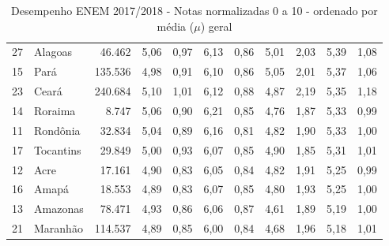 \begin{table}[]
{\begin{tabular}{llrrrrrrrrr}
            \rowcolor[HTML]{DCE6F1}
            27 & Alagoas             & 46.462  & 5,06 & 0,97 & 6,13 & 0,86 & 5,01 & 2,03 & 5,39 & 1,08 \\
            15 & Pará                & 135.536 & 4,98 & 0,91 & 6,10 & 0,86 & 5,05 & 2,01 & 5,37 & 1,06 \\
            \rowcolor[HTML]{DCE6F1}
            23 & Ceará               & 240.684 & 5,10 & 1,01 & 6,12 & 0,88 & 4,87 & 2,19 & 5,35 & 1,18 \\
            14 & Roraima             & 8.747   & 5,06 & 0,90 & 6,21 & 0,85 & 4,76 & 1,87 & 5,33 & 0,99 \\
            \rowcolor[HTML]{DCE6F1}
            11 & Rondônia            & 32.834  & 5,04 & 0,89 & 6,16 & 0,81 & 4,82 & 1,90 & 5,33 & 1,00 \\
            17 & Tocantins           & 29.849  & 5,00 & 0,93 & 6,07 & 0,85 & 4,90 & 1,85 & 5,31 & 1,01 \\
            \rowcolor[HTML]{DCE6F1}
            12 & Acre                & 17.161  & 4,90 & 0,83 & 6,05 & 0,84 & 4,82 & 1,91 & 5,25 & 0,99 \\
            16 & Amapá               & 18.553  & 4,89 & 0,83 & 6,07 & 0,85 & 4,80 & 1,93 & 5,25 & 1,00 \\
            \rowcolor[HTML]{DCE6F1}
            13 & Amazonas            & 78.471  & 4,93 & 0,86 & 6,06 & 0,87 & 4,61 & 1,89 & 5,19 & 1,00 \\
            21 & Maranhão            & 114.537 & 4,89 & 0,85 & 6,00 & 0,84 & 4,68 & 1,96 & 5,18 & 1,01
        \end{tabular}
    }
    \caption{ Desempenho ENEM 2017/2018 - Notas normalizadas 0 a 10 - ordenado por média ($\mu$) geral}
    \label{table:ENEM}
\end{table}
